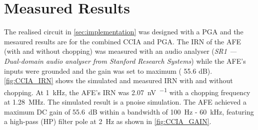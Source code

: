 \section{Measured Results}\label{sec:results}
The realised circuit in \cref{sec:implementation} was designed with a PGA and the mesaured results are for the combined CCIA and PGA. The IRN of the AFE (with and without chopping) was measured with an audio analyser (\textit{SR1 — Dual-domain audio analyser from Stanford Research Systems}) while the AFE's inputs were grounded and the gain was set to maximum ( 55.6 dB). \cref{fig:CCIA_IRN} shows the simulated and measured IRN with and without chopping. At \SI{1}{\kilo\hertz}, the AFE's IRN was \SI{2.07}{\nano\volt\per\sqrt{\hertz}} with a chopping frequency at \SI{1.28}{\mega\hertz}. The simulated result is a pnoise simulation. The AFE achieved a maximum DC gain of \SI{55.6}{\deci\bel} within a bandwidth of \SI{100}{\hertz} - \SI{60}{\kilo\hertz}, featuring a high-pass (HP) filter pole at \SI{2}{\hertz} as shown in \cref{fig:CCIA_GAIN}. 
